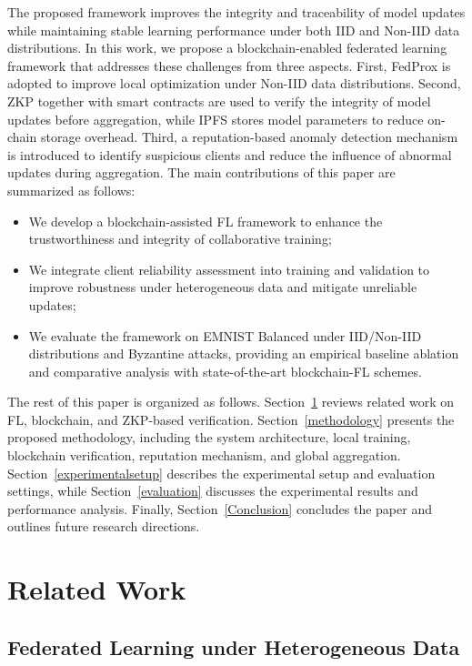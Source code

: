 \documentclass[conference, a4paper]{IEEEtran}
\begin{document}
The proposed framework improves the integrity and traceability of model updates while maintaining stable learning performance under both IID and Non-IID data distributions. In this work, we propose a blockchain-enabled federated learning framework that addresses these challenges from three aspects. First, FedProx is adopted to improve local optimization under Non-IID data distributions. Second, ZKP together with smart contracts are used to verify the integrity of model updates before aggregation, while IPFS stores model parameters to reduce on-chain storage overhead. Third, a reputation-based anomaly detection mechanism is introduced to identify suspicious clients and reduce the influence of abnormal updates during aggregation. The main contributions of this paper are summarized as follows:
\begin{itemize}
    \item We develop a blockchain-assisted FL framework to enhance the trustworthiness and integrity of collaborative training;

    \item We integrate client reliability assessment into training and validation to improve robustness under heterogeneous data and mitigate unreliable updates;
    
    \item We evaluate the framework on EMNIST Balanced under IID/Non-IID distributions and Byzantine attacks, providing an empirical baseline ablation and comparative analysis with state-of-the-art blockchain-FL schemes.
\end{itemize}

The rest of this paper is organized as follows. Section~\ref{relatedwork} reviews related work on FL, blockchain, and ZKP-based verification. Section~\ref{methodology} presents the proposed methodology, including the system architecture, local training, blockchain verification, reputation mechanism, and global aggregation. Section~\ref{experimentalsetup} describes the experimental setup and evaluation settings, while Section~\ref{evaluation} discusses the experimental results and performance analysis. Finally, Section~\ref{Conclusion} concludes the paper and outlines future research directions.

\section{Related Work}\label{relatedwork}

\subsection{Federated Learning under Heterogeneous Data}
\end{document}

